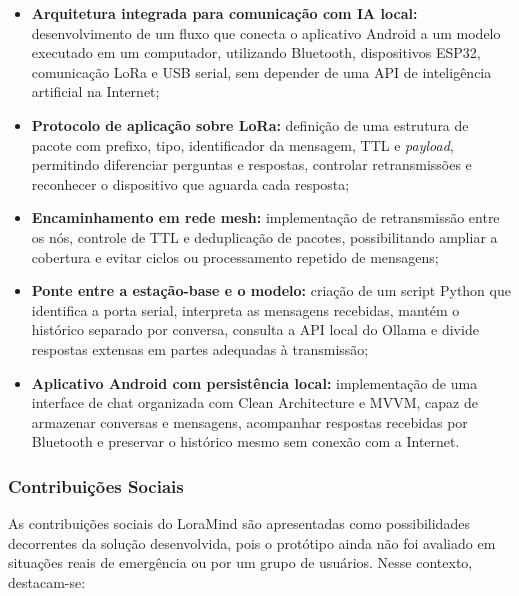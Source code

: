 \documentclass[12pt]{article}
\begin{document}
\begin{itemize}
    \item \textbf{Arquitetura integrada para comunicação com IA local:} desenvolvimento de um fluxo que conecta o aplicativo Android a um modelo executado em um computador, utilizando Bluetooth, dispositivos ESP32, comunicação LoRa e USB serial, sem depender de uma API de inteligência artificial na Internet;

    \item \textbf{Protocolo de aplicação sobre LoRa:} definição de uma estrutura de pacote com prefixo, tipo, identificador da mensagem, TTL e \textit{payload}, permitindo diferenciar perguntas e respostas, controlar retransmissões e reconhecer o dispositivo que aguarda cada resposta;

    \item \textbf{Encaminhamento em rede mesh:} implementação de retransmissão entre os nós, controle de TTL e deduplicação de pacotes, possibilitando ampliar a cobertura e evitar ciclos ou processamento repetido de mensagens;

    \item \textbf{Ponte entre a estação-base e o modelo:} criação de um script Python que identifica a porta serial, interpreta as mensagens recebidas, mantém o histórico separado por conversa, consulta a API local do Ollama e divide respostas extensas em partes adequadas à transmissão;

    \item \textbf{Aplicativo Android com persistência local:} implementação de uma interface de chat organizada com Clean Architecture e MVVM, capaz de armazenar conversas e mensagens, acompanhar respostas recebidas por Bluetooth e preservar o histórico mesmo sem conexão com a Internet.
\end{itemize}

\subsubsection{Contribuições Sociais}

As contribuições sociais do LoraMind são apresentadas como possibilidades decorrentes da solução desenvolvida, pois o protótipo ainda não foi avaliado em situações reais de emergência ou por um grupo de usuários. Nesse contexto, destacam-se:
\end{document}
